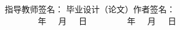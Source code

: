 \begin{titlepage}
{{        }}

        \vspace{2.5em}

        \noindent 指导教师签名：\underline{\hspace{7em}}  \qquad\qquad 毕业设计（论文）作者签名：\underline{\hspace{7em}} \\[-0.75em]

        \ $\qquad\quad\ \  $年$\quad\ \ $月$\quad\ \ $日 \qquad\qquad\qquad\qquad\qquad\quad\ \  $\qquad\quad\ \  $年$\quad\ \ $月$\quad\ \ $日
  
\end{titlepage}

\clearpage